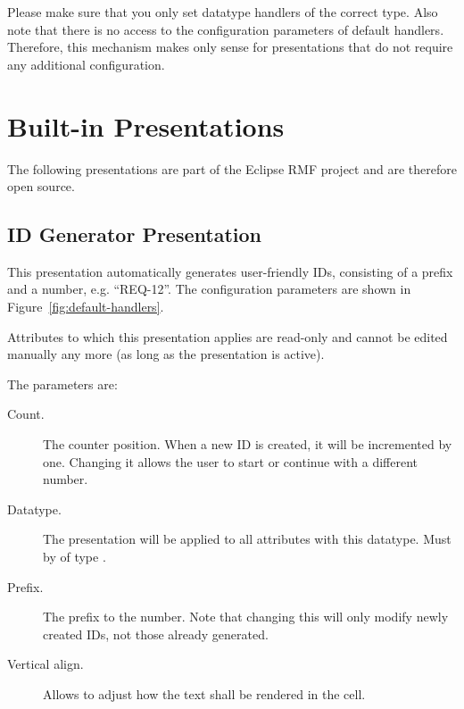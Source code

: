 \begin{warning}
Please make sure that you only set datatype handlers of the correct type.  Also note that there is no access to the configuration parameters of default handlers. Therefore, this mechanism makes only sense for presentations that do not require any additional configuration.
\end{warning}

\section{Built-in Presentations}

The following presentations are part of the Eclipse RMF project and are therefore open source.

\subsection{ID Generator Presentation}
\label{sec:id_presentation}

This presentation automatically generates user-friendly IDs, consisting of a prefix and a number, e.g. ``REQ-12''. The configuration parameters are shown in Figure~\ref{fig:default-handlers}.

\begin{info}
Attributes to which this presentation applies are read-only and cannot be edited manually any more (as long as the presentation is active).
\end{info}

The parameters are:

\begin{description}
\item[Count.] The counter position. When a new ID is created, it will be incremented by one.  Changing it allows  the user to start or continue with a different number.
\item[Datatype.] The presentation will be applied to all attributes with this datatype.  Must by of type .
\item[Prefix.] The prefix to the number.  Note that changing this will only modify newly created IDs, not those already generated.
\item[Vertical align.] Allows to adjust how the text shall be rendered in the cell.
\end{description}

